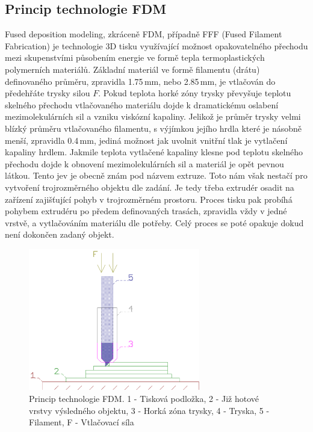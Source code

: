 \subsection{Princip technologie FDM}
Fused deposition modeling, zkráceně FDM, případně FFF (Fused Filament Fabrication) je technologie 3D tisku využívající možnost opakovatelného přechodu mezi skupenstvími působením energie ve formě tepla termoplastických polymerních materiálů. Základní materiál ve formě filamentu (drátu) definovaného průměru, zpravidla 1.75\,mm, nebo 2.85\,mm, je vtlačován do předehřáte trysky silou $F$. Pokud teplota horké zóny trysky převyšuje teplotu skelného přechodu vtlačovaného materiálu dojde k dramatickému oslabení mezimolekulárních sil a vzniku viskózní kapaliny. Jelikož je průměr trysky velmi blízký průměru vtlačovaného filamentu, s výjímkou jejího hrdla které je násobně menší, zpravidla 0.4\,mm, jediná možnost jak uvolnit vnitřní tlak je vytlačení kapaliny hrdlem. Jakmile teplota vytlačené kapaliny klesne pod teplotu skelného přechodu dojde k obnovení mezimolekulárních sil a materiál je opět pevnou látkou. Tento jev je obecně znám pod názvem extruze.
Toto nám však nestačí pro vytvoření trojrozměrného objektu dle zadání. Je tedy třeba extrudér osadit na zařízení zajišťující pohyb v trojrozměrném prostoru.
Proces tisku pak probíhá pohybem extrudéru po předem definovaných trasách, zpravidla vždy v jedné vrstvě, a vytlačováním materiálu dle potřeby. Celý proces se poté opakuje dokud není dokončen zadaný objekt.
\begin{figure}[!htbp!]
\begin{center}
\includegraphics[width=7.5cm]{pics/fdm}
\caption{Princip technologie FDM. 1 - Tisková podložka, 2 - Již hotové vrstvy výsledného objektu, 3 - Horká zóna trysky, 4 - Tryska, 5 - Filament, F - Vtlačovací síla}
\end{center}
\end{figure}


